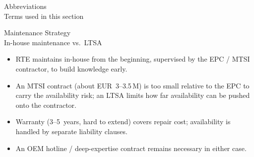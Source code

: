 
\begin{frame}{Abbreviations\\Terms used in this section}
\end{frame}


\begin{frame}{Maintenance Strategy\\In-house maintenance vs.\ LTSA}

  \begin{itemize}
    \setlength{\itemsep}{0.4em}
    \item RTE maintains in-house from the beginning, supervised by the EPC / MTSI contractor, to build knowledge early.
    \item An MTSI contract (about EUR~3--3.5\,M) is too small relative to the EPC to carry the availability risk; an LTSA limits how far availability can be pushed onto the contractor.
    \item Warranty (3--5~years, hard to extend) covers repair cost; availability is handled by separate liability clauses.
    \item An OEM hotline / deep-expertise contract remains necessary in either case.
  \end{itemize}
\end{frame}


